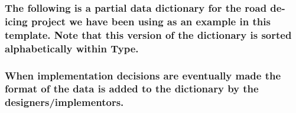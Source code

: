 \documentclass[
]{article}
\begin{document}
\hypertarget{the-following-is-a-partial-data-dictionary-for-the-road-de-icing-project-we-have-been-using-as-an-example-in-this-template.-note-that-this-version-of-the-dictionary-is-sorted-alphabetically-within-type.}{%
\subsubsection{\texorpdfstring{The following is a partial data
dictionary for the road de-icing project we have been using as an
example in this template. Note that this version of the dictionary is
sorted alphabetically within Type.
}{The following is a partial data dictionary for the road de-icing project we have been using as an example in this template. Note that this version of the dictionary is sorted alphabetically within Type. }}\label{the-following-is-a-partial-data-dictionary-for-the-road-de-icing-project-we-have-been-using-as-an-example-in-this-template.-note-that-this-version-of-the-dictionary-is-sorted-alphabetically-within-type.}}

\hypertarget{when-implementation-decisions-are-eventually-made-the-format-of-the-data-is-added-to-the-dictionary-by-the-designersimplementors.}{%
\subsubsection{When implementation decisions are eventually made the
format of the data is added to the dictionary by the
designers/implementors.}\label{when-implementation-decisions-are-eventually-made-the-format-of-the-data-is-added-to-the-dictionary-by-the-designersimplementors.}}

\hypertarget{section-10}{%
\subsubsection{}\label{section-10}}
\end{document}
